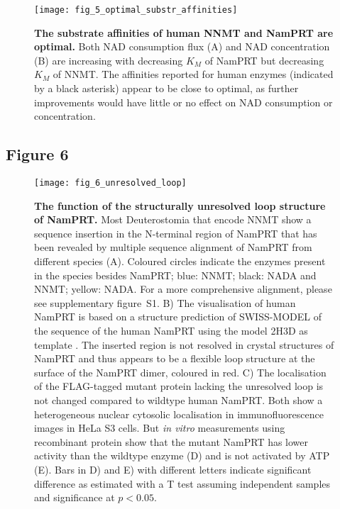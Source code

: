 \begin{figure}[ht]
  \centering
  \texttt{[image: fig\_5\_optimal\_substr\_affinities]}
  \caption{\textbf{The substrate affinities of human NNMT and NamPRT are optimal.} Both NAD consumption flux (A) and NAD concentration (B) are increasing with decreasing $K_M$ of NamPRT but decreasing $K_M$ of NNMT. The affinities reported for human enzymes (indicated by a black asterisk) appear to be close to optimal, as further improvements would have little or no effect on NAD consumption or concentration.}
  \label{fig:optimal_substr_affinities}
\end{figure}

\newpage


\subsection{Figure 6}

\begin{figure}[ht]
  \centering
  \texttt{[image: fig\_6\_unresolved\_loop]}
  \caption{\textbf{The function of the structurally unresolved loop structure of NamPRT.} Most Deuterostomia that encode NNMT show a sequence insertion in the N-terminal region of NamPRT that has been revealed by multiple sequence alignment of NamPRT from different species (A). Coloured circles indicate the enzymes present in the species besides NamPRT; blue: NNMT; black: NADA and NNMT; yellow: NADA. For a more comprehensive alignment, please see supplementary figure~S1. B) The visualisation of human NamPRT is based on a structure prediction of SWISS-MODEL \cite{Arnold2006,Biasini2014} of the sequence of the human NamPRT using the model 2H3D as template \cite{Wang2006}. The inserted region is not resolved in crystal structures of NamPRT and thus appears to be a flexible loop structure at the surface of the NamPRT dimer, coloured in red. C) The localisation of the FLAG-tagged mutant protein lacking the unresolved loop is not changed compared to wildtype human NamPRT. Both show a heterogeneous nuclear cytosolic localisation in immunofluorescence images in HeLa S3 cells. But \textit{in vitro} measurements using recombinant protein show that the mutant NamPRT has lower activity than the wildtype enzyme (D) and is not activated by ATP (E). Bars in D) and E) with different letters indicate significant difference as estimated with a T test assuming independent samples and significance at $p < 0.05$.}
  \label{fig:unresolved_loop}
\end{figure}

